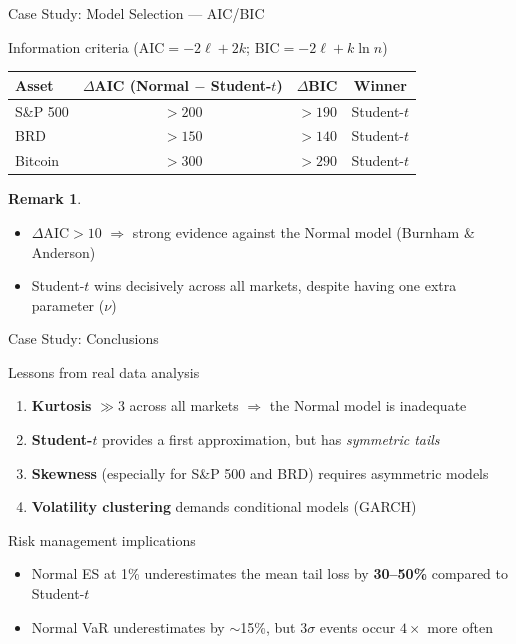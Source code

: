 \documentclass[9pt, aspectratio=169, t]{beamer}
\theoremstyle{definition}
\newtheorem{rmk}{Remark}
\begin{document}
\begin{frame}{Case Study: Model Selection --- AIC/BIC}
    \begin{block}{Information criteria ($\text{AIC} = -2\ell + 2k$; \; $\text{BIC} = -2\ell + k\ln n$)}
    \small
    {\centering
    \renewcommand{\arraystretch}{1.1}
    \begin{tabular}{lccc}
    \toprule
    \textbf{Asset} & \textbf{$\Delta$AIC (Normal $-$ Student-$t$)} & \textbf{$\Delta$BIC} & \textbf{Winner} \\
    \midrule
    S\&P 500 & $> 200$ & $> 190$ & Student-$t$ \\
    BRD      & $> 150$ & $> 140$ & Student-$t$ \\
    Bitcoin  & $> 300$ & $> 290$ & Student-$t$ \\
    \bottomrule
    \end{tabular}\par}
    \end{block}

    \begin{rmk}
    \begin{itemize}
    \item $\Delta\text{AIC} > 10$ $\Rightarrow$ strong evidence against the Normal model (Burnham \& Anderson)
    \item Student-$t$ wins decisively across all markets, despite having one extra parameter ($\nu$)
    \end{itemize}
    \end{rmk}
\end{frame}

\begin{frame}{Case Study: Conclusions}
    \begin{block}{Lessons from real data analysis}
    \small
    \begin{enumerate}
        \item \textbf{Kurtosis} $\gg 3$ across all markets $\Rightarrow$ the Normal model is inadequate
        \item \textbf{Student-$t$} provides a first approximation, but has \emph{symmetric tails}
        \item \textbf{Skewness} (especially for S\&P 500 and BRD) requires asymmetric models
        \item \textbf{Volatility clustering} demands conditional models (GARCH)
    \end{enumerate}
    \end{block}

    \begin{alertblock}{Risk management implications}
    \begin{itemize}\setlength{\itemsep}{0pt}
        \item Normal ES at 1\% underestimates the mean tail loss by \textbf{30--50\%} compared to Student-$t$
        \item Normal VaR underestimates by $\sim$15\%, but $3\sigma$ events occur $4\times$ more often
    \end{itemize}
    \end{alertblock}
\end{frame}
\end{document}
